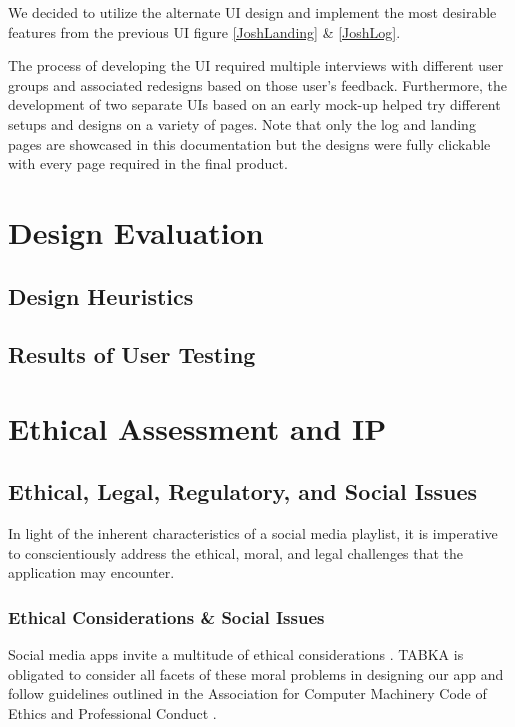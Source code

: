 \documentclass[12pt,asmart]{report}
\begin{document}
We decided to utilize the alternate UI design and implement the most desirable features from the previous UI figure \ref{JoshLanding} \& \ref{JoshLog}.

The process of developing the UI required multiple interviews with different user groups and associated redesigns based on those user's feedback. Furthermore, the development of two separate UIs based on an early mock-up helped try different setups and designs on a variety of pages. Note that only the log and landing pages are showcased in this documentation but the designs were fully clickable with every page required in the final product.

\chapter{Design Evaluation}
\section{Design Heuristics}
\section{Results of User Testing}

\chapter{Ethical Assessment and IP}
\section{Ethical, Legal, Regulatory, and Social Issues}
In light of the inherent characteristics of a social media playlist, it is imperative to conscientiously address the ethical, moral, and legal challenges that the application may encounter.
\subsection{Ethical Considerations \& Social Issues}
Social media apps invite a multitude of ethical considerations \cite{Digital_Communications_Division_DCD2013-mf}. TABKA is obligated to consider all facets of these moral problems in designing our app and follow guidelines outlined in the Association for Computer Machinery Code of Ethics and Professional Conduct \cite{ACM_Code_2018_Task_Force_Executive_Committee_Don_Gotterbarn_Chair_Bo_Brinkman_Catherine_Flick_Michael_S_Kirkpatrick_Keith_Miller_Kate_Varansky_and_Marty_J_Wolf_Members_Eve_Anderson_Ron_Anderson_Amy_Bruckman_Karla_Carter_Michael_Davis_Penny_Duquenoy_Jeremy_Epstein_Kai_Kimppa_Lorraine_Kisselburgh_Shrawan_Kumar_Andrew_McGettrick_Natasa_Milic-Frayling_Denise_Oram_Simon_Rogerson_David_Shamma_Janice_Sipior_Eugene_Spafford_and_Les_Waguespack_undated-hy}.
\end{document}
